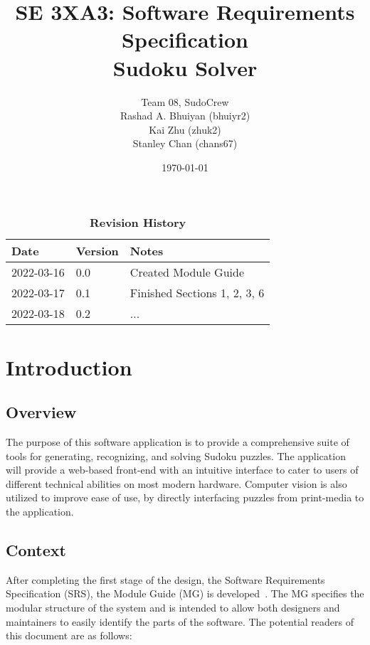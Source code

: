 \documentclass[12pt, titlepage]{article}
\title{SE 3XA3: Software Requirements Specification\\Sudoku Solver}
\author{Team 08, SudoCrew
		\\ Rashad A. Bhuiyan (bhuiyr2)
		\\ Kai Zhu (zhuk2)
		\\ Stanley Chan (chans67)
}
\date{\today}
\begin{document}
\maketitle

\tableofcontents
\listoftables
\listoffigures

\newpage

\begin{table}[h]
\caption{\bf Revision History}
\begin{tabularx}{\textwidth}{p{3cm}p{2cm}X}
\toprule {\bf Date} & {\bf Version} & {\bf Notes}\\
\midrule
2022-03-16 & 0.0 & Created Module Guide\\
2022-03-17 & 0.1 & Finished Sections 1, 2, 3, 6\\
2022-03-18 & 0.2 & ...\\
\bottomrule
\end{tabularx}
\end{table}

\newpage


\section{Introduction}

\subsection{Overview}
The purpose of this software application is to provide a comprehensive suite of tools for generating, recognizing, and solving Sudoku puzzles. The application will provide a web-based front-end with an intuitive interface to cater to users of different technical abilities on most modern hardware. Computer vision is also utilized to improve ease of use, by directly interfacing puzzles from print-media to the application.

\subsection{Context}
After completing the first stage of the design, the Software Requirements
Specification (SRS), the Module Guide (MG) is developed~\citep{ParnasEtAl1984}. The MG
specifies the modular structure of the system and is intended to allow both
designers and maintainers to easily identify the parts of the software.  The
potential readers of this document are as follows:
\end{document}
